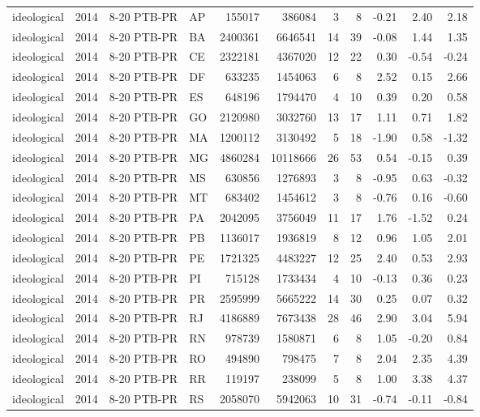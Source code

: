 \begin{landscape}
\begin{longtable}{lllL{1.4cm}rrrrrrr}
ideological & 2014 & 8-20 PTB-PR & AP & 155017 & 386084 & 3 & 8 & -0.21 & 2.40 & 2.18 \\
ideological & 2014 & 8-20 PTB-PR & BA & 2400361 & 6646541 & 14 & 39 & -0.08 & 1.44 & 1.35 \\
ideological & 2014 & 8-20 PTB-PR & CE & 2322181 & 4367020 & 12 & 22 & 0.30 & -0.54 & -0.24 \\
ideological & 2014 & 8-20 PTB-PR & DF & 633235 & 1454063 & 6 & 8 & 2.52 & 0.15 & 2.66 \\
ideological & 2014 & 8-20 PTB-PR & ES & 648196 & 1794470 & 4 & 10 & 0.39 & 0.20 & 0.58 \\
ideological & 2014 & 8-20 PTB-PR & GO & 2120980 & 3032760 & 13 & 17 & 1.11 & 0.71 & 1.82 \\
ideological & 2014 & 8-20 PTB-PR & MA & 1200112 & 3130492 & 5 & 18 & -1.90 & 0.58 & -1.32 \\
ideological & 2014 & 8-20 PTB-PR & MG & 4860284 & 10118666 & 26 & 53 & 0.54 & -0.15 & 0.39 \\
ideological & 2014 & 8-20 PTB-PR & MS & 630856 & 1276893 & 3 & 8 & -0.95 & 0.63 & -0.32 \\
ideological & 2014 & 8-20 PTB-PR & MT & 683402 & 1454612 & 3 & 8 & -0.76 & 0.16 & -0.60 \\
ideological & 2014 & 8-20 PTB-PR & PA & 2042095 & 3756049 & 11 & 17 & 1.76 & -1.52 & 0.24 \\
ideological & 2014 & 8-20 PTB-PR & PB & 1136017 & 1936819 & 8 & 12 & 0.96 & 1.05 & 2.01 \\
ideological & 2014 & 8-20 PTB-PR & PE & 1721325 & 4483227 & 12 & 25 & 2.40 & 0.53 & 2.93 \\
ideological & 2014 & 8-20 PTB-PR & PI & 715128 & 1733434 & 4 & 10 & -0.13 & 0.36 & 0.23 \\
ideological & 2014 & 8-20 PTB-PR & PR & 2595999 & 5665222 & 14 & 30 & 0.25 & 0.07 & 0.32 \\
ideological & 2014 & 8-20 PTB-PR & RJ & 4186889 & 7673438 & 28 & 46 & 2.90 & 3.04 & 5.94 \\
ideological & 2014 & 8-20 PTB-PR & RN & 978739 & 1580871 & 6 & 8 & 1.05 & -0.20 & 0.84 \\
ideological & 2014 & 8-20 PTB-PR & RO & 494890 & 798475 & 7 & 8 & 2.04 & 2.35 & 4.39 \\
ideological & 2014 & 8-20 PTB-PR & RR & 119197 & 238099 & 5 & 8 & 1.00 & 3.38 & 4.37 \\
ideological & 2014 & 8-20 PTB-PR & RS & 2058070 & 5942063 & 10 & 31 & -0.74 & -0.11 & -0.84 \\

\end{longtable}
\end{landscape}
